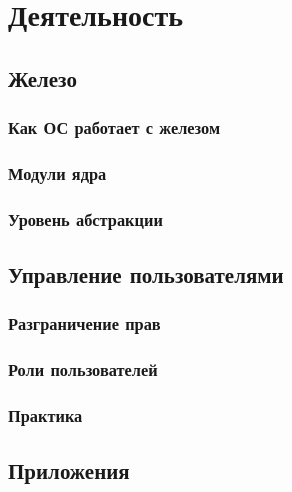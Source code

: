 \section{Деятельность}
\subsection{Железо}
\subsubsection{Как ОС работает с железом}
\subsubsection{Модули ядра}
\subsubsection{Уровень абстракции}
\subsection{Управление пользователями}
\subsubsection{Разграничение прав}
\subsubsection{Роли пользователей}
\subsubsection{Практика}
\subsection{Приложения}